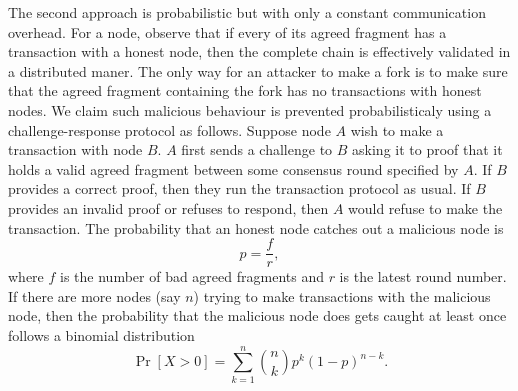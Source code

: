 The second approach is probabilistic but with only a constant communication overhead.
For a node, observe that if every of its agreed fragment has a transaction with a honest node,
then the complete chain is effectively validated in a distributed maner.
The only way for an attacker to make a fork is to make sure that the agreed fragment containing the fork has no transactions with honest nodes.
We claim such malicious behaviour is prevented probabilisticaly using a challenge-response protocol as follows.
Suppose node $A$ wish to make a transaction with node $B$.
$A$ first sends a challenge to $B$ asking it to proof that it holds a valid agreed fragment between some consensus round specified by $A$.
If $B$ provides a correct proof, then they run the transaction protocol as usual.
If $B$ provides an invalid proof or refuses to respond,
then $A$ would refuse to make the transaction.
The probability that an honest node catches out a malicious node is 
$$p = \frac{f}{r},$$
where $f$ is the number of bad agreed fragments and $r$ is the latest round number.
If there are more nodes (say $n$) trying to make transactions with the malicious node,
then the probability that the malicious node does gets caught at least once follows a binomial distribution
$$\Pr[X > 0] = \sum_{k = 1}^{n}\binom{n}{k}p^k (1 - p)^{n - k}.$$







